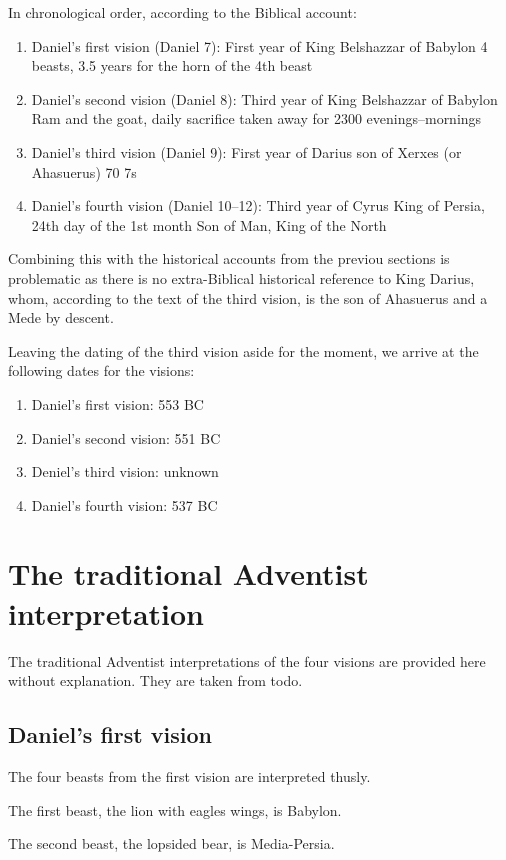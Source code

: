 \documentclass[]{article}
\begin{document}
In chronological order, according to the Biblical account:
\begin{enumerate}
    \item Daniel's first vision (Daniel 7): First year of King Belshazzar of Babylon  4 beasts, 3.5 years for the horn of the 4th beast
    \item Daniel's second vision (Daniel 8): Third year of King Belshazzar of Babylon Ram and the goat, daily sacrifice taken away for 2300 evenings--mornings
    \item Daniel's third vision (Daniel 9): First year of Darius son of Xerxes (or Ahasuerus)  70 7s
    \item Daniel's fourth vision (Daniel 10--12): Third year of Cyrus King of Persia, 24th day of the 1st month  Son of Man, King of the North
\end{enumerate}

Combining this with the historical accounts from the previou sections is problematic as there is no extra-Biblical historical reference to King Darius, whom,
according to the text of the third vision, is the son of Ahasuerus and a Mede by descent.

Leaving the dating of the third vision aside for the moment, we arrive at the following dates for the visions:
\begin{enumerate}
    \item Daniel's first vision: 553 BC
    \item Daniel's second vision: 551 BC
    \item Deniel's third vision: unknown
    \item Daniel's fourth vision: 537 BC
\end{enumerate}

\section{The traditional Adventist interpretation}
The traditional Adventist interpretations of the four visions are provided here without explanation.
They are taken from todo.

\subsection{Daniel's first vision}
The four beasts from the first vision are interpreted thusly.

The first beast, the lion with eagles wings, is Babylon.

The second beast, the lopsided bear, is Media-Persia.
\end{document}
